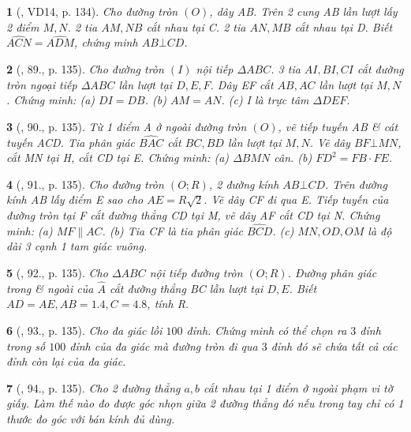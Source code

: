 \documentclass{article}
\newtheorem{baitoan}{}
\begin{document}
\begin{baitoan}[\cite{Tuyen_Toan_9_old}, VD14, p. 134]
	Cho đường tròn $(O)$, dây AB. Trên 2 cung AB lần lượt lấy 2 điểm $M,N$. 2 tia $AM,NB$ cắt nhau tại C. 2 tia $AN,MB$ cắt nhau tại D. Biết $\widehat{ACN} = \widehat{ADM}$, chứng minh $AB\bot CD$.
\end{baitoan}

\begin{baitoan}[\cite{Tuyen_Toan_9_old}, 89., p. 135]
	Cho đường tròn $(I)$ nội tiếp $\Delta ABC$. 3 tia $AI,BI,CI$ cắt đường tròn ngoại tiếp $\Delta ABC$ lần lượt tại $D,E,F$. Dây EF cắt $AB,AC$ lần lượt tại $M,N$. Chứng minh: (a) $DI = DB$. (b) $AM = AN$. (c) I là trực tâm $\Delta DEF$.
\end{baitoan}

\begin{baitoan}[\cite{Tuyen_Toan_9_old}, 90., p. 135]
	Từ 1 điểm A ở ngoài đường tròn $(O)$, vẽ tiếp tuyến AB \& cát tuyến ACD. Tia phân giác $\widehat{BAC}$ cắt $BC,BD$ lần lượt tại $M,N$. Vẽ dây $BF\bot MN$, cắt MN tại H, cắt CD tại E. Chứng minh: (a) $\Delta BMN$ cân. (b) $FD^2 = FB\cdot FE$.
\end{baitoan}

\begin{baitoan}[\cite{Tuyen_Toan_9_old}, 91., p. 135]
	Cho đường tròn $(O;R)$, 2 đường kính $AB\bot CD$. Trên đường kính AB lấy điểm E sao cho $AE = R\sqrt{2}$. Vẽ dây CF đi qua E. Tiếp tuyến của đường tròn tại F cắt đường thẳng CD tại M, vẽ dây AF cắt CD tại N. Chứng minh: (a) $MF\parallel AC$. (b) Tia CF là tia phân giác $\widehat{BCD}$. (c) $MN,OD,OM$ là độ dài 3 cạnh 1 tam giác vuông.
\end{baitoan}

\begin{baitoan}[\cite{Tuyen_Toan_9_old}, 92., p. 135]
	Cho $\Delta ABC$ nội tiếp đường tròn $(O;R)$. Đường phân giác trong \& ngoài của $\widehat{A}$ cắt đường thẳng BC lần lượt tại $D,E$. Biết $AD = AE,AB = 1.4,C = 4.8$, tính R.
\end{baitoan}

\begin{baitoan}[\cite{Tuyen_Toan_9_old}, 93., p. 135]
	Cho đa giác lồi $100$ đỉnh. Chứng minh có thể chọn ra $3$ đỉnh trong số $100$ đỉnh của đa giác mà đường tròn đi qua $3$ đỉnh đó sẽ chứa tất cả các đỉnh còn lại của đa giác.
\end{baitoan}

\begin{baitoan}[\cite{Tuyen_Toan_9_old}, 94., p. 135]
	Cho 2 đường thẳng $a,b$ cắt nhau tại 1 điểm ở ngoài phạm vi tờ giấy. Làm thế nào đo được góc nhọn giữa 2 đường thẳng đó nếu trong tay chỉ có 1 thước đo góc với bán kính đủ dùng.
\end{baitoan}
\end{document}
